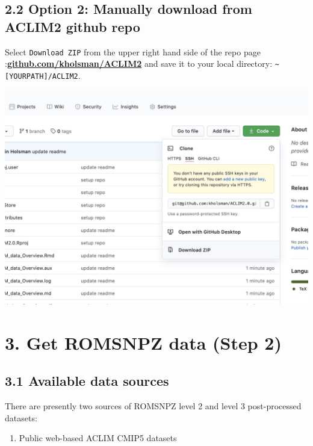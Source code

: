 \documentclass[
]{article}
\providecommand{\tightlist}{%
  \setlength{\itemsep}{0pt}\setlength{\parskip}{0pt}}
\begin{document}
\hypertarget{option-2-manually-download-from-aclim2-github-repo}{%
\subsection{2.2 Option 2: Manually download from ACLIM2 github
repo}\label{option-2-manually-download-from-aclim2-github-repo}}

Select \texttt{Download\ ZIP} from the upper right hand side of the repo
page
:\href{https://github.com/kholsman/ACLIM2}{\textbf{github.com/kholsman/ACLIM2}}
and save it to your local directory:
\texttt{\textasciitilde{}{[}YOURPATH{]}/ACLIM2}.

\includegraphics[width=1\textwidth,height=\textheight]{Figs/clone.jpg}

\hypertarget{get-romsnpz-data-step-2}{%
\section{3. Get ROMSNPZ data (Step 2)}\label{get-romsnpz-data-step-2}}

\hypertarget{available-data-sources}{%
\subsection{3.1 Available data sources}\label{available-data-sources}}

There are presently two sources of ROMSNPZ level 2 and level 3
post-processed datasets:

\begin{enumerate}
\def\labelenumi{\arabic{enumi})}
\tightlist
\item
  Public web-based ACLIM CMIP5 datasets
\end{enumerate}
\end{document}
